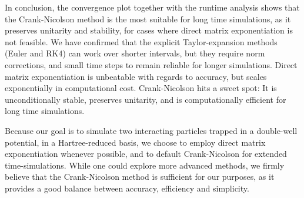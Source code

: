 \documentclass{subfiles}
\begin{document}
In conclusion, the convergence plot together with the runtime analysis shows that the Crank-Nicolson method is the most suitable for long time simulations, as it preserves unitarity and stability, for cases where direct matrix exponentiation is not feasible. We have confirmed that the explicit Taylor-expansion methods (Euler and RK4) can work over shorter intervals, but they require norm corrections, and small time steps to remain reliable for longer simulations. Direct matrix exponentiation is unbeatable with regards to accuracy, but scales exponentially in computational cost. Crank-Nicolson hits a sweet spot: It is unconditionally stable, preserves unitarity, and is computationally efficient for long time simulations. 

Because our goal is to simulate two interacting particles trapped in a double-well potential, in a Hartree-reduced basis, we choose to employ direct matrix exponentiation whenever possible, and to default Crank-Nicolson for extended time-simulations. While one could explore more advanced methods, we firmly believe that the Crank-Nicolson method is sufficient for our purposes, as it provides a good balance between accuracy, efficiency and simplicity.
\end{document}

